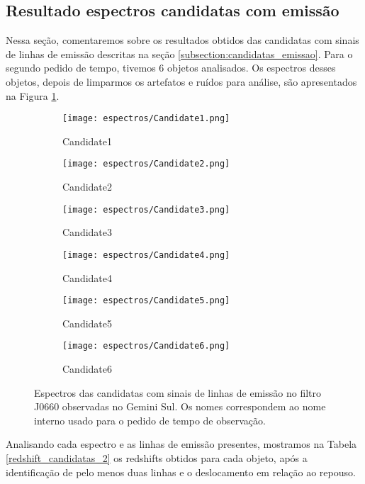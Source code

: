 \subsection{Resultado espectros candidatas com emissão}\label{subsection:resultado_espectros_emissao}

Nessa seção, comentaremos sobre os resultados obtidos das candidatas com sinais de linhas de emissão descritas na seção \ref{subsection:candidatas_emissao}. Para o segundo pedido de tempo, tivemos 6 objetos analisados. Os espectros desses objetos, depois de limparmos os artefatos e ruídos para análise, são apresentados na Figura \ref{espectros_candidatas_2}.

\begin{figure}[!ht]
    \centering
    \captionsetup{justification=centering}
    \begin{subfigure}[b]{0.45\textwidth}
        \texttt{[image: espectros/Candidate1.png]}
        \caption{Candidate1}
    \end{subfigure}
    \begin{subfigure}[b]{0.45\textwidth}
        \texttt{[image: espectros/Candidate2.png]}
        \caption{Candidate2}
    \end{subfigure}
    \begin{subfigure}[b]{0.45\textwidth}
        \texttt{[image: espectros/Candidate3.png]}
        \caption{Candidate3}
    \end{subfigure}
    \begin{subfigure}[b]{0.45\textwidth}
        \texttt{[image: espectros/Candidate4.png]}
        \caption{Candidate4}
    \end{subfigure}
    \begin{subfigure}[b]{0.45\textwidth}
        \texttt{[image: espectros/Candidate5.png]}
        \caption{Candidate5}
    \end{subfigure}
    \begin{subfigure}[b]{0.45\textwidth}
        \texttt{[image: espectros/Candidate6.png]}
        \caption{Candidate6}
    \end{subfigure}
    \caption{Espectros das candidatas com sinais de linhas de emissão no filtro J0660 observadas no Gemini Sul. Os nomes correspondem ao nome interno usado para o pedido de tempo de observação.}
    \label{espectros_candidatas_2}
\end{figure}

Analisando cada espectro e as linhas de emissão presentes, mostramos na Tabela \ref{redshift_candidatas_2} os redshifts obtidos para cada objeto, após a identificação de pelo menos duas linhas e o deslocamento em relação ao repouso.

